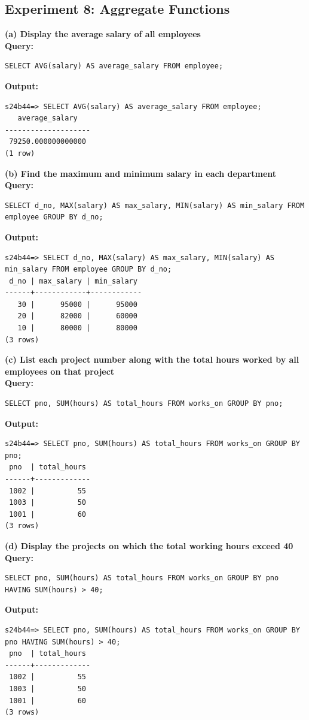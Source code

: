 \documentclass[12pt, a4paper]{article}
\begin{document}
\newpage
\subsection*{Experiment 8: Aggregate Functions}

\textbf{(a) Display the average salary of all employees}\\
\textbf{Query:}
\begin{lstlisting}
SELECT AVG(salary) AS average_salary FROM employee;
\end{lstlisting}
\textbf{Output:}
\begin{lstlisting}[style=terminal]
s24b44=> SELECT AVG(salary) AS average_salary FROM employee;
   average_salary   
--------------------
 79250.000000000000
(1 row)
\end{lstlisting}

\textbf{(b) Find the maximum and minimum salary in each department}\\
\textbf{Query:}
\begin{lstlisting}
SELECT d_no, MAX(salary) AS max_salary, MIN(salary) AS min_salary FROM employee GROUP BY d_no;
\end{lstlisting}
\textbf{Output:}
\begin{lstlisting}[style=terminal]
s24b44=> SELECT d_no, MAX(salary) AS max_salary, MIN(salary) AS min_salary FROM employee GROUP BY d_no;
 d_no | max_salary | min_salary 
------+------------+------------
   30 |      95000 |      95000
   20 |      82000 |      60000
   10 |      80000 |      80000
(3 rows)
\end{lstlisting}

\textbf{(c) List each project number along with the total hours worked by all employees on that project}\\
\textbf{Query:}
\begin{lstlisting}
SELECT pno, SUM(hours) AS total_hours FROM works_on GROUP BY pno;
\end{lstlisting}
\textbf{Output:}
\begin{lstlisting}[style=terminal]
s24b44=> SELECT pno, SUM(hours) AS total_hours FROM works_on GROUP BY pno;
 pno  | total_hours 
------+-------------
 1002 |          55
 1003 |          50
 1001 |          60
(3 rows)
\end{lstlisting}

\textbf{(d) Display the projects on which the total working hours exceed 40}\\
\textbf{Query:}
\begin{lstlisting}
SELECT pno, SUM(hours) AS total_hours FROM works_on GROUP BY pno HAVING SUM(hours) > 40;
\end{lstlisting}
\textbf{Output:}
\begin{lstlisting}[style=terminal]
s24b44=> SELECT pno, SUM(hours) AS total_hours FROM works_on GROUP BY pno HAVING SUM(hours) > 40;
 pno  | total_hours 
------+-------------
 1002 |          55
 1003 |          50
 1001 |          60
(3 rows)
\end{lstlisting}
\end{document}
